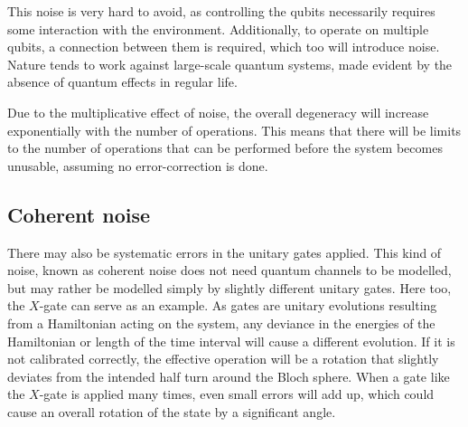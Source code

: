 This noise is very hard to avoid, as controlling the qubits necessarily requires some interaction with the environment.
Additionally, to operate on multiple qubits, a connection between them is required, which too will introduce noise.
Nature tends to work against large-scale quantum systems, made evident by the absence of quantum effects in regular life.

Due to the multiplicative effect of noise, the overall degeneracy will increase exponentially with the number of operations.
This means that there will be limits to the number of operations that can be performed before the system becomes unusable, assuming no error-correction is done.

\subsection{Coherent noise}
There may also be systematic errors in the unitary gates applied.
This kind of noise, known as coherent noise does not need quantum channels to be modelled, but may rather be modelled simply by slightly different unitary gates.
Here too, the $X$-gate can serve as an example.
As gates are unitary evolutions resulting from a Hamiltonian acting on the system, any deviance in the energies of the Hamiltonian or length of the time interval will cause a different evolution.
If it is not calibrated correctly, the effective operation will be a rotation that slightly deviates from the intended half turn around the Bloch sphere.
When a gate like the $X$-gate is applied many times, even small errors will add up, which could cause an overall rotation of the state by a significant angle.

